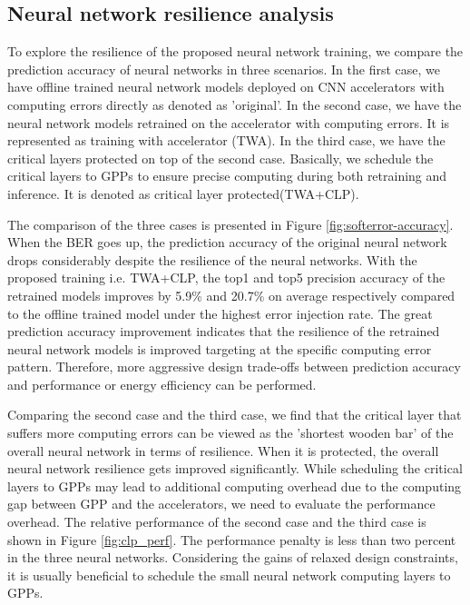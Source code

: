 \subsection{Neural network resilience analysis}
To explore the resilience of the proposed neural network training, we
compare the prediction accuracy of neural networks in three scenarios.
In the first case, we have offline trained neural network models deployed on 
CNN accelerators with computing errors directly as denoted as 'original'.
In the second case, we have the neural network models retrained on the 
accelerator with computing errors. It is represented as training with 
accelerator (TWA). In the third case, we have the critical layers 
protected on top of the second case. Basically, we schedule the critical layers to 
GPPs to ensure precise computing during both retraining and inference.
It is denoted as critical layer protected(TWA+CLP).

The comparison of the three cases is presented in Figure \ref{fig:softerror-accuracy}.
When the BER goes up, the prediction accuracy of the original neural network drops 
considerably despite the resilience of the neural networks. 
With the proposed training i.e. TWA+CLP, the top1 and top5 precision accuracy 
of the retrained models improves by 5.9\% and 20.7\% on average respectively 
compared to the offline trained model under the highest error injection rate. 
The great prediction accuracy improvement indicates that the resilience 
of the retrained neural network models is improved targeting at the 
specific computing error pattern. Therefore, more aggressive design trade-offs 
between prediction accuracy and performance or energy efficiency can be performed. 

Comparing the second case and the third case, we find that the critical layer 
that suffers more computing errors can be viewed as the 'shortest 
wooden bar' of the overall neural network in terms of resilience. When it is protected, 
the overall neural network resilience gets improved significantly.
While scheduling the critical layers to GPPs may lead to additional computing overhead 
due to the computing gap between GPP and the accelerators, we need to evaluate the 
performance overhead. The relative performance of the second case and the third case 
is shown in Figure \ref{fig:clp_perf}. The performance penalty is less than two percent 
in the three neural networks. Considering the gains of relaxed design constraints, 
it is usually beneficial to schedule the small neural network computing layers to GPPs. 

